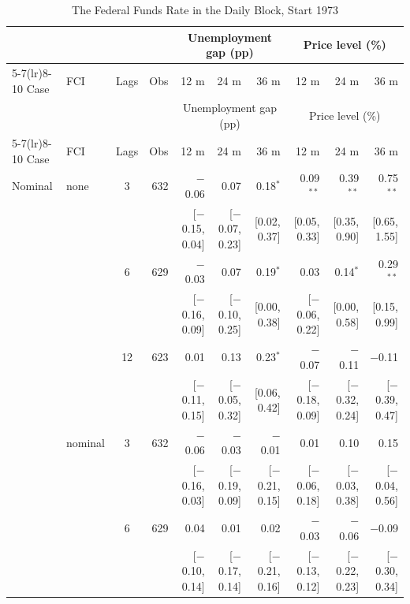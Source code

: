 \begingroup\scriptsize\setlength{\tabcolsep}{0.9pt}
\begin{longtable}{llcrrrrrrr}
\caption{The Federal Funds Rate in the Daily Block, Start 1973}\label{tab:appR873}\\
\toprule
 & & & & \multicolumn{3}{c}{Unemployment gap (pp)} & \multicolumn{3}{c}{Price level (\%)}\\ \cmidrule(lr){5-7}\cmidrule(lr){8-10}
Case & FCI & Lags & Obs & 12 m & 24 m & 36 m & 12 m & 24 m & 36 m\\
\midrule\endfirsthead
\toprule
 & & & & \multicolumn{3}{c}{Unemployment gap (pp)} & \multicolumn{3}{c}{Price level (\%)}\\ \cmidrule(lr){5-7}\cmidrule(lr){8-10}
Case & FCI & Lags & Obs & 12 m & 24 m & 36 m & 12 m & 24 m & 36 m\\
\midrule\endhead
\bottomrule\endfoot
Nominal & none & 3 & 632 & $-$0.06 & 0.07 & 0.18$^{*}$ & 0.09$^{**}$ & 0.39$^{**}$ & 0.75$^{**}$\\
 & & & & {\scriptsize [$-$0.15, 0.04]} & {\scriptsize [$-$0.07, 0.23]} & {\scriptsize [0.02, 0.37]} & {\scriptsize [0.05, 0.33]} & {\scriptsize [0.35, 0.90]} & {\scriptsize [0.65, 1.55]}\\
 &  & 6 & 629 & $-$0.03 & 0.07 & 0.19$^{*}$ & 0.03 & 0.14$^{*}$ & 0.29$^{**}$\\
 & & & & {\scriptsize [$-$0.16, 0.09]} & {\scriptsize [$-$0.10, 0.25]} & {\scriptsize [0.00, 0.38]} & {\scriptsize [$-$0.06, 0.22]} & {\scriptsize [0.00, 0.58]} & {\scriptsize [0.15, 0.99]}\\
 &  & 12 & 623 & 0.01 & 0.13 & 0.23$^{*}$ & $-$0.07 & $-$0.11 & $-$0.11\\
 & & & & {\scriptsize [$-$0.11, 0.15]} & {\scriptsize [$-$0.05, 0.32]} & {\scriptsize [0.06, 0.42]} & {\scriptsize [$-$0.18, 0.09]} & {\scriptsize [$-$0.32, 0.24]} & {\scriptsize [$-$0.39, 0.47]}\\
 & nominal & 3 & 632 & $-$0.06 & $-$0.03 & $-$0.01 & 0.01 & 0.10 & 0.15\\
 & & & & {\scriptsize [$-$0.16, 0.03]} & {\scriptsize [$-$0.19, 0.09]} & {\scriptsize [$-$0.21, 0.15]} & {\scriptsize [$-$0.06, 0.18]} & {\scriptsize [$-$0.03, 0.38]} & {\scriptsize [$-$0.04, 0.56]}\\
 &  & 6 & 629 & 0.04 & 0.01 & 0.02 & $-$0.03 & $-$0.06 & $-$0.09\\
 & & & & {\scriptsize [$-$0.10, 0.14]} & {\scriptsize [$-$0.17, 0.14]} & {\scriptsize [$-$0.21, 0.16]} & {\scriptsize [$-$0.13, 0.12]} & {\scriptsize [$-$0.22, 0.23]} & {\scriptsize [$-$0.30, 0.34]}\\

\end{longtable}
